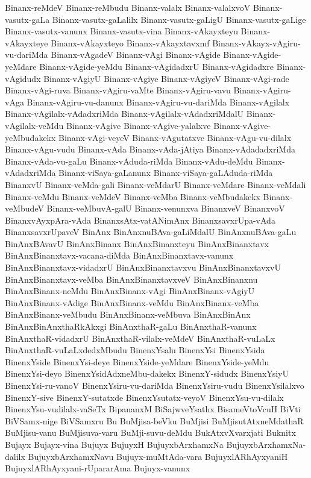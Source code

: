 {Binanx-reMdeV
Binanx-reMbudu
Binanx-valalx
Binanx-valalxvoV
Binanx-vasutx-gaLa
Binanx-vasutx-gaLalilx
Binanx-vasutx-gaLigU
Binanx-vasutx-gaLige
Binanx-vasutx-vanunx
Binanx-vasutx-vina
Binanx-vAkayxteyu
Binanx-vAkayxteye
Binanx-vAkayxteyo
Binanx-vAkayxtavxmf
Binanx-vAkayx-vAgiru-vu-dariMda
Binanx-vAgadeV
Binanx-vAgi
Binanx-vAgide
Binanx-vAgide-yeMdare
Binanx-vAgide-yeMdu
Binanx-vAgidadxrU
Binanx-vAgidadxre
Binanx-vAgidudx
Binanx-vAgiyU
Binanx-vAgiye
Binanx-vAgiyeV
Binanx-vAgi-rade
Binanx-vAgi-ruva
Binanx-vAgiru-vaMte
Binanx-vAgiru-vavu
Binanx-vAgiru-vAga
Binanx-vAgiru-vu-danunx
Binanx-vAgiru-vu-dariMda
Binanx-vAgilalx
Binanx-vAgilalx-vAdadxriMda
Binanx-vAgilalx-vAdadxriMdalU
Binanx-vAgilalx-veMdu
Binanx-vAgive
Binanx-vAgive-yalalxve
Binanx-vAgive-yeMbudakekx
Binanx-vAgi-veyeV
Binanx-vAgutatxve
Binanx-vAgu-vu-dilalx
Binanx-vAgu-vudu
Binanx-vAda
Binanx-vAda-jAtiya
Binanx-vAdadadxriMda
Binanx-vAda-vu-gaLu
Binanx-vAduda-riMda
Binanx-vAdu-deMdu
Binanx-vAdadxriMda
Binanx-viSaya-gaLanunx
Binanx-viSaya-gaLAduda-riMda
BinanxvU
Binanx-veMda-gali
Binanx-veMdarU
Binanx-veMdare
Binanx-veMdali
Binanx-veMdu
Binanx-veMdeV
Binanx-veMba
Binanx-veMbudakekx
Binanx-veMbudeV
Binanx-veMbuvA-galU
Binanx-venunxva
BinanxveV
BinanxvoV
BinanxvAyxpAra-vAda
BinanxsAtx-vatANimAnx
BinanxsavxrUpa-vAda
BinanxsavxrUpaveV
BinAnx
BinAnxnuBAva-gaLiMdalU
BinAnxnuBAva-gaLu
BinAnxBAvavU
BinAnxBinanx
BinAnxBinanxteyu
BinAnxBinanxtavx
BinAnxBinanxtavx-vacana-diMda
BinAnxBinanxtavx-vanunx
BinAnxBinanxtavx-vidadxrU
BinAnxBinanxtavxvu
BinAnxBinanxtavxvU
BinAnxBinanxtavx-veMba
BinAnxBinanxtavxveV
BinAnxBinanxnu
BinAnxBinanx-neMdu
BinAnxBinanx-vAgi
BinAnxBinanx-vAgiyU
BinAnxBinanx-vAdige
BinAnxBinanx-veMdu
BinAnxBinanx-veMba
BinAnxBinanx-veMbudu
BinAnxBinanx-veMbuva
BinAnxBinAnx
BinAnxBinAnxthaRkAkxgi
BinAnxthaR-gaLu
BinAnxthaR-vanunx
BinAnxthaR-vidadxrU
BinAnxthaR-vilalx-veMdeV
BinAnxthaR-vuLaLx
BinAnxthaR-vuLaLxdedxMbudu
BinenxYsalu
BinenxYsi
BinenxYsida
BinenxYside
BinenxYsi-deye
BinenxYside-yeMdare
BinenxYside-yeMdu
BinenxYsi-deyo
BinenxYsidAdxneMbu-dakekx
BinenxY-sidudx
BinenxYsiyU
BinenxYsi-ru-vanoV
BinenxYsiru-vu-dariMda
BinenxYsiru-vudu
BinenxYsilalxvo
BinenxY-sive
BinenxY-sutatxde
BinenxYsutatx-veyoV
BinenxYsu-vu-dilalx
BinenxYsu-vudilalx-vaSeTx
BipananxM
BiSajwveYsathx
BisameVtoVcuH
BiVti
BiVSamx-nige
BiVSamxru
Bu
BuMjisa-beVku
BuMjisi
BuMjisutAtxneMdathaR
BuMjisu-vanu
BuMjisuva-varu
BuMji-suvu-deMdu
BukAtxvXvarxjati
Buknitx
Bujayx
Bujayx-vina
Bujuyx
BujuyxH
BujuyxbArxhamxNa
BujuyxbArxhamxNa-dalilx
BujuyxbArxhamxNavu
Bujuyx-muMtAda-vara
BujuyxlARhAyxyaniH
BujuyxlARhAyxyani-rUpararAma
Bujuyx-vanunx
}
